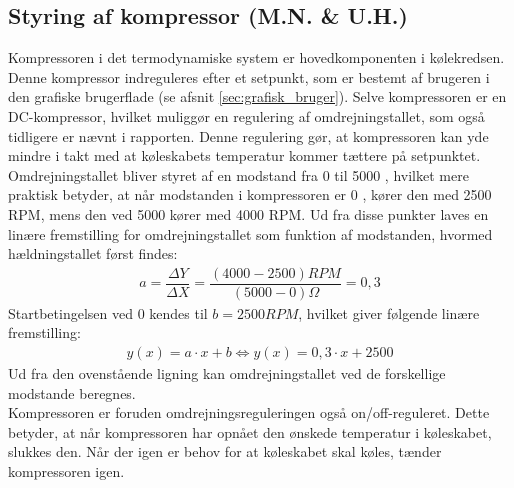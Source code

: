 \documentclass[../Hovedrapport.tex]{subfiles}
\begin{document}
\subsection*{Styring af kompressor (M.N. \& U.H.)}
Kompressoren i det termodynamiske system er hovedkomponenten i kølekredsen. Denne kompressor indreguleres efter et setpunkt, som er bestemt af brugeren i den grafiske brugerflade (se afsnit \ref{sec:grafisk_bruger}). 
Selve kompressoren er en DC-kompressor, hvilket muliggør en regulering af omdrejningstallet, som også tidligere er nævnt i rapporten. Denne regulering gør, at kompressoren kan yde mindre i takt med at køleskabets temperatur kommer tættere på setpunktet. Omdrejningstallet bliver styret af en modstand fra 0 til 5000 \si{\Omega}, hvilket mere praktisk betyder, at når modstanden i kompressoren er 0 \si{\Omega}, kører den med 2500 RPM, mens den ved 5000 \si{\Omega} kører med 4000 RPM. 
Ud fra disse punkter laves en linære fremstilling for omdrejningstallet som funktion af modstanden, hvormed hældningstallet først findes:
\begin{align}
    a=\dfrac{\Delta Y}{\Delta X}=\dfrac{(4000-2500) \si{RPM}}{(5000-0) \si{\Omega}}=0,3
\end{align}
Startbetingelsen ved 0 \si{\Omega} kendes til $b=2500 \si{RPM}$, hvilket giver følgende linære fremstilling:
\begin{align}
    y(x)=a\cdot x + b \Leftrightarrow y(x)=0,3\cdot x + 2500
\end{align}
Ud fra den ovenstående ligning kan omdrejningstallet ved de forskellige modstande beregnes.\\
Kompressoren er foruden omdrejningsreguleringen også on/off-reguleret. Dette betyder, at når kompressoren har opnået den ønskede temperatur i køleskabet, slukkes den. Når der igen er behov for at køleskabet skal køles, tænder kompressoren igen. 
\end{document}
